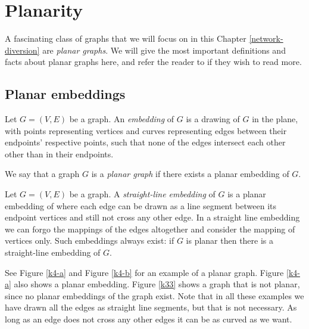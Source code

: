 \section{Planarity}
A fascinating class of graphs that we will focus on in this Chapter \ref{network-diversion} are \emph{planar graphs}. We will give the most important definitions and facts about planar graphs here, and refer the reader to \cite{planar_graphs} if they wish to read more.

\subsection{Planar embeddings}
\begin{definition}[Embedding]
    Let $G = (V,E)$ be a graph. An \emph{embedding} of $G$ is a drawing of $G$ in the plane, with points representing vertices and curves representing edges between their endpoints' respective points, such that none of the edges intersect each other other than in their endpoints.    
\end{definition}

\begin{definition}
    We say that a graph $G$ is a \emph{planar graph} if there exists a planar embedding of $G$.
\end{definition}

\begin{definition}
    Let $G = (V,E)$ be a graph. A \emph{straight-line embedding} of $G$ is a planar embedding of where each edge can be drawn as a line segment between its endpoint vertices and still not cross any other edge. In a straight line embedding we can forgo the mappings of the edges altogether and consider the mapping of vertices only. Such embeddings always exist: if $G$ is planar then there is a straight-line embedding of $G$.
\end{definition}

See Figure \ref{k4-a} and Figure \ref{k4-b} for an example of a planar graph. Figure \ref{k4-a} also shows a planar embedding. Figure \ref{k33} shows a graph that is not planar, since no planar embeddings of the graph exist. Note that in all these examples we have drawn all the edges as straight line segments, but that is not necessary. As long as an edge does not cross any other edges it can be as curved as we want.

